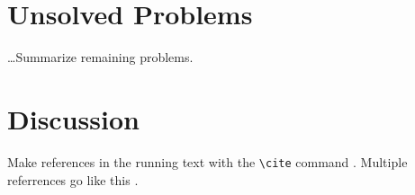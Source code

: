 \documentclass[a4paper]{article}
\begin{document}
\section{Unsolved Problems}

  \ldots Summarize remaining problems.

\section{Discussion}

  Make references in the running text with the \verb+\cite+
  command \cite{dijkstra68}. Multiple referrences go like this
  \cite{charniak85,steels98}.


  




\end{document}
